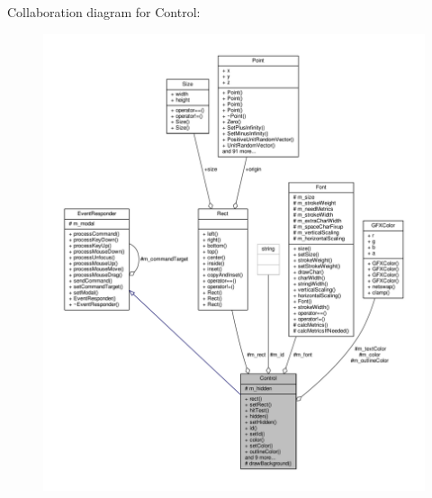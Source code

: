 Collaboration diagram for Control\+:
\nopagebreak
\begin{figure}[H]
\begin{center}
\leavevmode
\includegraphics[width=350pt]{d5/de6/classControl__coll__graph}
\end{center}
\end{figure}
